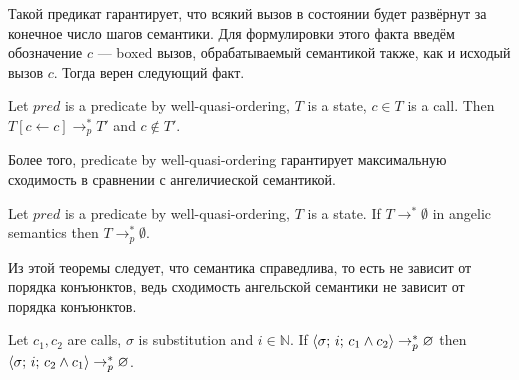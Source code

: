 \noindent Такой предикат гарантирует, что всякий вызов в состоянии будет развёрнут за конечное число шагов семантики. Для формулировки этого факта введём обозначение $\boxed{c}$ --- boxed вызов, обрабатываемый семантикой также, как и исходый вызов $c$. Тогда верен следующий факт.

\begin{lemma}
Let $pred$ is a predicate by well-quasi-ordering, $T$ is a state, $c \in T$ is a call. Then $T[c \leftarrow \boxed{c}] \rightarrow_p^* T'$ and $\boxed{c} \not\in T'$.
\end{lemma}

Более того, predicate by well-quasi-ordering гарантирует максимальную сходимость в сравнении с ангеличиеской семантикой.

\begin{theorem}
Let $pred$ is a predicate by well-quasi-ordering, $T$ is a state.
If $T \rightarrow^* \emptyset$ in angelic semantics then $T \rightarrow^*_p \emptyset$.
\end{theorem}

Из этой теоремы следует, что семантика справедлива, то есть не зависит от порядка конъюнктов, ведь сходимость ангельской семантики не зависит от порядка конъюнктов.

\begin{corollary}
Let $c_1, c_2$ are calls, $\sigma$ is substitution and $i \in \mathbb{N}$. If
$\langle \sigma;\, i;\, c_1 \land c_2 \rangle \rightarrow^*_p \varnothing$ then $\langle \sigma;\, i;\, c_2 \land c_1 \rangle \rightarrow^*_p \varnothing$.
\end{corollary}

